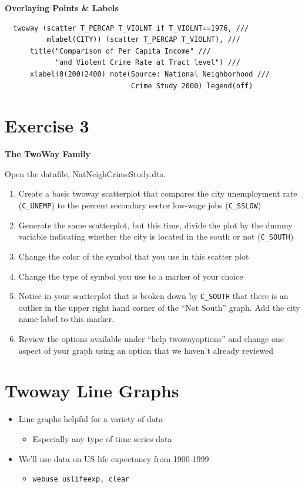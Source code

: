 \documentclass[]{book}
\providecommand{\tightlist}{%
  \setlength{\itemsep}{0pt}\setlength{\parskip}{0pt}}
\begin{document}
\textbf{Overlaying Points \& Labels}

\begin{verbatim}
  twoway (scatter T_PERCAP T_VIOLNT if T_VIOLNT==1976, ///
          mlabel(CITY)) (scatter T_PERCAP T_VIOLNT), ///
      title("Comparison of Per Capita Income" ///
            "and Violent Crime Rate at Tract level") ///
      xlabel(0(200)2400) note(Source: National Neighborhood ///
                              Crime Study 2000) legend(off)
\end{verbatim}

\section{Exercise 3}\label{exercise-3-5}

\textbf{The TwoWay Family}

Open the datafile, NatNeighCrimeStudy.dta.

\begin{enumerate}
\def\labelenumi{\arabic{enumi}.}
\tightlist
\item
  Create a basic twoway scatterplot that compares the city unemployment
  rate (\texttt{C\_UNEMP}) to the percent secondary sector low-wage jobs
  (\texttt{C\_SSLOW})
\item
  Generate the same scatterplot, but this time, divide the plot by the
  dummy variable indicating whether the city is located in the south or
  not (\texttt{C\_SOUTH})
\item
  Change the color of the symbol that you use in this scatter plot
\item
  Change the type of symbol you use to a marker of your choice
\item
  Notice in your scatterplot that is broken down by \texttt{C\_SOUTH}
  that there is an outlier in the upper right hand corner of the ``Not
  South'' graph. Add the city name label to this marker.
\item
  Review the options available under ``help twowayoptions'' and change
  one aspect of your graph using an option that we haven't already
  reviewed
\end{enumerate}

\section{Twoway Line Graphs}\label{twoway-line-graphs}

\begin{itemize}
\tightlist
\item
  Line graphs helpful for a variety of data

  \begin{itemize}
  \tightlist
  \item
    Especially any type of time series data
  \end{itemize}
\item
  We'll use data on US life expectancy from 1900-1999

  \begin{itemize}
  \tightlist
  \item
    \texttt{webuse\ uslifeexp,\ clear}
  \end{itemize}
\end{itemize}
\end{document}
